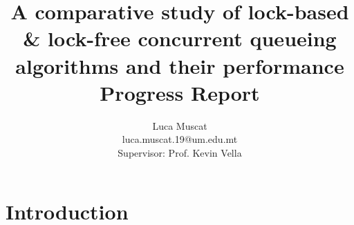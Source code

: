 \documentclass[a4paper, 12pt, titlepage]{article}
\begin{document}
\title{A comparative study of lock-based & lock-free concurrent queueing algorithms and their performance \\ Progress Report}
\author{Luca Muscat \\ luca.muscat.19@um.edu.mt \\ Supervisor: Prof. Kevin Vella}

\titleformat{\section}{\Large\bfseries\filcenter}{}{0em}{}
\titleformat{\subsection}{\normalsize\bfseries\filcenter}{}{0em}{}
\titleformat{\subsubsection}{\small\bfseries}{}{0em}{}
\maketitle
\pagebreak
{}
\tableofcontents
\pagebreak
{}

\section{Introduction}

\end{document}
